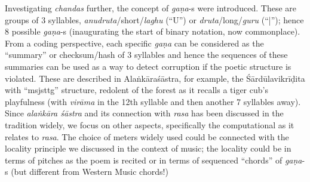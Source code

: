 Investigating \textsl{chandas} further, the concept of \textsl{gaṇa}-s were introduced. These are groups of 3 syllables, \textsl{anudruta}/short/\textsl{laghu} (“U”) or \textsl{druta}/long/\textsl{guru} (“|”); hence 8 possible \textsl{gaṇa}-s (inaugurating the start of binary notation, now commonplace). From a coding perspective, each specific \textsl{gaṇa} can be considered as the “summary” or checksum/hash of 3 syllables and hence the sequences of these summaries can be used as a way to detect corruption if the poetic structure is violated. These are described in Alaṅkāraśāstra, for example, the Śārdūlavikrīḍita with “msjsttg” structure, redolent of the forest as it recalls a tiger cub’s playfulness (with \textsl{virāma} in the 12th syllable and then another 7 syllables away). Since \textsl{alaṅkāra śāstra} and its connection with \textsl{rasa} has been discussed in the tradition widely, we focus on other aspects, specifically the computational as it relates to \textsl{rasa}. The choice of meters widely used could be connected with the locality principle we discussed in the context of music; the locality could be in terms of pitches as the poem is recited or in terms of sequenced “chords” of \textsl{gaṇa}-s (but different from Western Music chords!)

